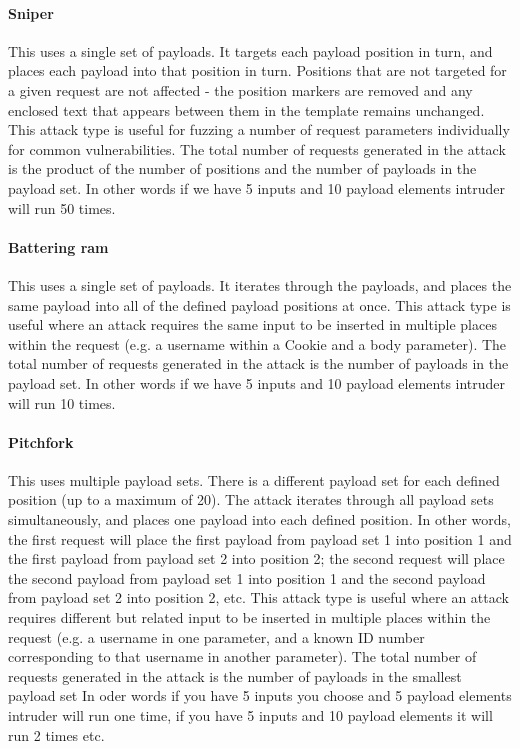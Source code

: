 \paragraph{Sniper}
This uses a single set of payloads.
It targets each payload position in turn, and places each payload into that position in turn.
Positions that are not targeted for a given request are not affected - the position markers are removed and any enclosed text that appears between them in the template remains unchanged.
This attack type is useful for fuzzing a number of request parameters individually for common vulnerabilities.
The total number of requests generated in the attack is the product of the number of positions and the number of payloads in the payload set.
In other words if we have 5 inputs and 10 payload elements intruder will run 50 times.
\paragraph{Battering ram}
This uses a single set of payloads.
It iterates through the payloads, and places the same payload into all of the defined payload positions at once.
This attack type is useful where an attack requires the same input to be inserted in multiple places within the request (e.g. a username within a Cookie and a body parameter).
The total number of requests generated in the attack is the number of payloads in the payload set.
In other words if we have 5 inputs and 10 payload elements intruder will run 10 times.
\paragraph{Pitchfork}
This uses multiple payload sets.
There is a different payload set for each defined position (up to a maximum of 20).
The attack iterates through all payload sets simultaneously, and places one payload into each defined position.
In other words, the first request will place the first payload from payload set 1 into position 1 and the first payload from payload set 2 into position 2;
the second request will place the second payload from payload set 1 into position 1 and the second payload from payload set 2 into position 2, etc.
This attack type is useful where an attack requires different but related input to be inserted in multiple places within the request (e.g. a username in one parameter, and a known ID number corresponding to that username in another parameter).
The total number of requests generated in the attack is the number of payloads in the smallest payload set
In oder words if you have 5 inputs you choose and 5  payload elements intruder will run one time, if you have 5 inputs and 10 payload elements it will run 2 times etc.
